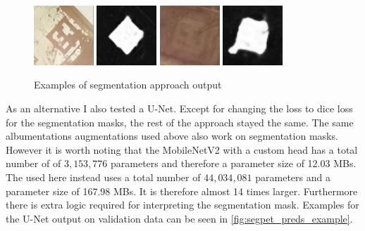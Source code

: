 \documentclass[10pt]{book}
\begin{document}
\begin{figure}
  \centering
     {\includegraphics[width=0.2\textwidth]{image/segpet_1_in}}
     {\includegraphics[width=0.2\textwidth]{image/segpet_1_pred}}
     {\includegraphics[width=0.2\textwidth]{image/segpet_3_in}}
     {\includegraphics[width=0.2\textwidth]{image/segpet_3_pred}}
  \caption{Examples of segmentation approach output}
  \label{fig:segpet_preds_example}
\end{figure}

As an alternative I also tested a U-Net. Except for changing the loss to dice loss for the segmentation masks, the rest of the approach stayed the same. The same albumentations augmentations used above also work on segmentation masks. However it is worth noting that the MobileNetV2 with a custom head has a total number of of $3,153,776$ parameters and therefore a parameter size of 12.03 \acp{MB}. The used here instead uses a total number of $44,034,081$ parameters and a parameter size of 167.98 \acp{MB}. It is therefore almost 14 times larger. Furthermore there is extra logic required for interpreting the segmentation mask. 
Examples for the U-Net output on validation data can be seen in \autoref{fig:segpet_preds_example}. 
\end{document}
